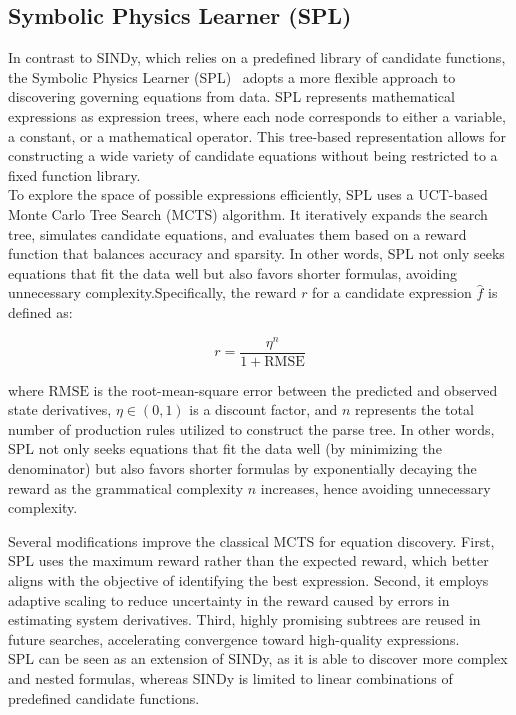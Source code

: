 \documentclass[11pt, a4paper]{article}
\begin{document}
\subsection{Symbolic Physics Learner (SPL)}

In contrast to SINDy, which relies on a predefined library of candidate functions, the Symbolic Physics Learner (SPL)~\cite{sun2023spl} adopts a more flexible approach to discovering governing equations from data. SPL represents mathematical expressions as expression trees, where each node corresponds to either a variable, a constant, or a mathematical operator. This tree-based representation allows for constructing a wide variety of candidate equations without being restricted to a fixed function library.\\

To explore the space of possible expressions efficiently, SPL uses a UCT-based Monte Carlo Tree Search (MCTS) algorithm. It iteratively expands the search tree, simulates candidate equations, and evaluates them based on a reward function that balances accuracy and sparsity. In other words, SPL not only seeks equations that fit the data well but also favors shorter formulas, avoiding unnecessary complexity.Specifically, the reward $r$ for a candidate expression $\hat{f}$ is defined as:

$$r = \frac{\eta^n}{1 + \text{RMSE}}$$

where $\text{RMSE}$ is the root-mean-square error between the predicted and observed state derivatives, $\eta \in (0,1)$ is a discount factor, and $n$ represents the total number of production rules utilized to construct the parse tree. In other words, SPL not only seeks equations that fit the data well (by minimizing the denominator) but also favors shorter formulas by exponentially decaying the reward as the grammatical complexity $n$ increases, hence avoiding unnecessary complexity.

Several modifications improve the classical MCTS for equation discovery. First, SPL uses the maximum reward rather than the expected reward, which better aligns with the objective of identifying the best expression. Second, it employs adaptive scaling to reduce uncertainty in the reward caused by errors in estimating system derivatives. Third, highly promising subtrees are reused in future searches, accelerating convergence toward high-quality expressions.\\

SPL can be seen as an extension of SINDy, as it is able to discover more complex and nested formulas, whereas SINDy is limited to linear combinations of predefined candidate functions.
\end{document}
